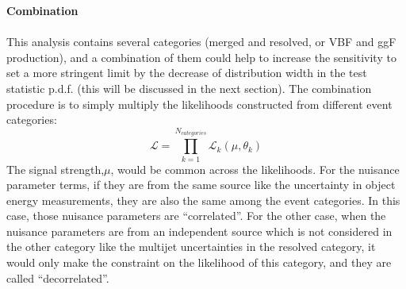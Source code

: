 \noindent
{\bf Combination}
\\
\\This analysis contains several categories (merged and resolved, or VBF and ggF production), and a combination of them could help to increase the sensitivity to set a more stringent limit by the decrease of distribution width in the test statistic p.d.f. (this will be discussed in the next section). The combination procedure is to simply multiply the likelihoods constructed from different event categories\cite{asymptotics}:
\begin{equation}
\mathcal{L}=\displaystyle\prod_{k=1}^{N_{categories}} \mathcal{L}_{k}(\mu, \theta_k)
\end{equation}
The signal strength,$\mu$, would be common across the likelihoods. For the nuisance parameter terms, if they are from the same source like the uncertainty in object energy measurements, they are also the same among the event categories. In this case, those nuisance parameters are ``correlated''. For the other case, when the nuisance parameters are from an independent source which is not considered in the other category like the multijet uncertainties in the resolved category, it would only make the constraint on the likelihood of this category, and they are called ``decorrelated''.  

